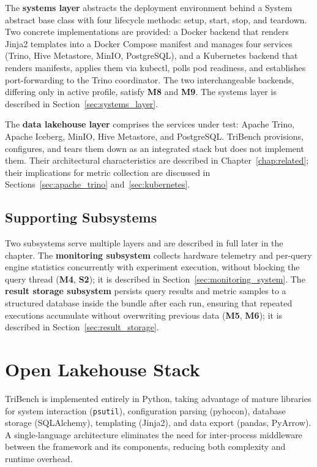 \documentclass{l4proj}
\begin{document}
The \textbf{systems layer} abstracts the deployment environment behind a System abstract base class with four lifecycle methods: setup, start, stop, and teardown. Two concrete implementations are provided: a Docker backend that renders Jinja2 templates into a Docker Compose manifest and manages four services (Trino, Hive Metastore, MinIO, PostgreSQL), and a Kubernetes backend that renders manifests, applies them via kubectl, polls pod readiness, and establishes port-forwarding to the Trino coordinator. The two interchangeable backends, differing only in active profile, satisfy \textbf{M8} and \textbf{M9}. The systems layer is described in Section~\ref{sec:systems_layer}.

The \textbf{data lakehouse layer} comprises the services under test: Apache Trino, Apache Iceberg, MinIO, Hive Metastore, and PostgreSQL. TriBench provisions, configures, and tears them down as an integrated stack but does not implement them. Their architectural characteristics are described in Chapter~\ref{chap:related}; their implications for metric collection are discussed in Sections~\ref{sec:apache_trino} and~\ref{sec:kubernetes}.

\subsection{Supporting Subsystems}
\label{sec:cross_cutting}

Two subsystems serve multiple layers and are described in full later in the chapter. The \textbf{monitoring subsystem} collects hardware telemetry and per-query engine statistics concurrently with experiment execution, without blocking the query thread (\textbf{M4}, \textbf{S2}); it is described in Section~\ref{sec:monitoring_system}. The \textbf{result storage subsystem} persists query results and metric samples to a structured database inside the bundle after each run, ensuring that repeated executions accumulate without overwriting previous data (\textbf{M5}, \textbf{M6}); it is described in Section~\ref{sec:result_storage}.

\section{Open Lakehouse Stack}
\label{sec:tech_stack}

TriBench is implemented entirely in Python, taking advantage of mature libraries for system interaction (\texttt{psutil}), configuration parsing (pyhocon), database storage (SQLAlchemy), templating (Jinja2), and data export (pandas, PyArrow). A single-language architecture eliminates the need for inter-process middleware between the framework and its components, reducing both complexity and runtime overhead. 
\end{document}
